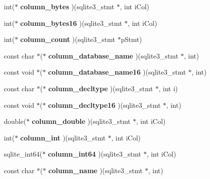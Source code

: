 \begin{CompactItemize}
\item 
int($\ast$ \textbf{column\_\-bytes} )(sqlite3\_\-stmt $\ast$, int iCol)\label{structsqlite3__api__routines_9154a95e6a64e9aee74a0aa5ba1f356e}

\item 
int($\ast$ \textbf{column\_\-bytes16} )(sqlite3\_\-stmt $\ast$, int iCol)\label{structsqlite3__api__routines_c530c05ed061ba8657bf3608ad07ba59}

\item 
int($\ast$ \textbf{column\_\-count} )(sqlite3\_\-stmt $\ast$pStmt)\label{structsqlite3__api__routines_6e6725314a39923c38579ae0bd1a5893}

\item 
const char $\ast$($\ast$ \textbf{column\_\-database\_\-name} )(sqlite3\_\-stmt $\ast$, int)\label{structsqlite3__api__routines_a8686074c774e2516df58b81bc587372}

\item 
const void $\ast$($\ast$ \textbf{column\_\-database\_\-name16} )(sqlite3\_\-stmt $\ast$, int)\label{structsqlite3__api__routines_a5d92e88e326cf366beba3ef8be37504}

\item 
const char $\ast$($\ast$ \textbf{column\_\-decltype} )(sqlite3\_\-stmt $\ast$, int i)\label{structsqlite3__api__routines_fbd2bf759da299627ea832cb63775be0}

\item 
const void $\ast$($\ast$ \textbf{column\_\-decltype16} )(sqlite3\_\-stmt $\ast$, int)\label{structsqlite3__api__routines_768e6df27b87415f073c967d32d5460a}

\item 
double($\ast$ \textbf{column\_\-double} )(sqlite3\_\-stmt $\ast$, int iCol)\label{structsqlite3__api__routines_4a93b1b12ac2def6b8153c9d1b723f9f}

\item 
int($\ast$ \textbf{column\_\-int} )(sqlite3\_\-stmt $\ast$, int iCol)\label{structsqlite3__api__routines_375da027bfdc8ec22d8834e79752c0fd}

\item 
sqlite\_\-int64($\ast$ \textbf{column\_\-int64} )(sqlite3\_\-stmt $\ast$, int iCol)\label{structsqlite3__api__routines_7aa6bb26b6c060b8cc61876bc54f1d07}

\item 
const char $\ast$($\ast$ \textbf{column\_\-name} )(sqlite3\_\-stmt $\ast$, int)\label{structsqlite3__api__routines_784cfd596610faa920342ed09f1a37a6}


\end{CompactItemize}
